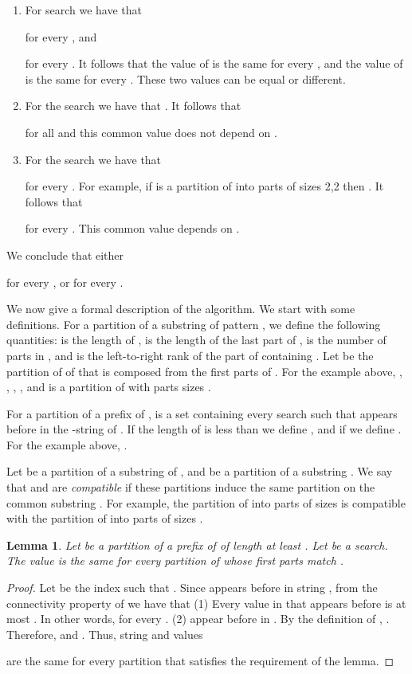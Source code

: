 \documentclass[12pt]{article}
\newtheorem{lemma}[theorem]{Lemma}
\begin{document}
\begin{enumerate}
\item
For search  we have that 

for every , and 

for every .
It follows that the value of
 is the same
for every , and the value of 
 is the same
for every .
These two values can be equal or different.

\item
For the search  we have that 
.
It follows that

for all  and this common value does not depend on .

\item
For the search  we have that 

for every .
For example, if  is a partition of 
into parts of sizes 2,2 then 
.
It follows that

for every .
This common value depends on .

\end{enumerate}
We conclude that either 

for every ,
or 
for every .


We now give a formal description of the algorithm.
We start with some definitions.
For a partition  of a substring  of 
pattern , we define the following quantities:
 is the length of ,
 is the length of the last part of ,
 is the number of parts in ,
and  is the left-to-right rank of the part of
 containing .
Let  be the partition of 
 of  that is
composed from the first  parts of .
For the example above,
,
,
,
, and
 is a partition of  with
parts sizes .

For a partition  of a prefix  of ,
 is a set containing every search 
such that  appears before
 in the -string of .
If the length of  is less than  we define 
, and if  we define
.
For the example above, .

Let  be a partition of a substring
 of ,
and  be a partition of a substring .
We say that  and  are \emph{compatible}
if these partitions induce the same partition on the common substring
.
For example, the partition of  into parts of sizes 
is compatible with the partition of  into parts of sizes
.

\begin{lemma}\label{lem:optimal-1}
Let  be a partition of a prefix of  of length at least .
Let  be a search.
The value  is the same for every
partition  of  whose first  parts
match .
\end{lemma}
\begin{proof}
Let  be the index such that .
Since  appears before
 in string ,
from the connectivity property of  we have that
(1) Every value in  that appears before 
is at most .
In other words,  for every .
(2)  appear before
 in .
By the definition of ,
.
Therefore,  and 
.
Thus, string  and values

are the same for every partition  that satisfies the requirement of
the lemma.
\end{proof}
\end{document}

